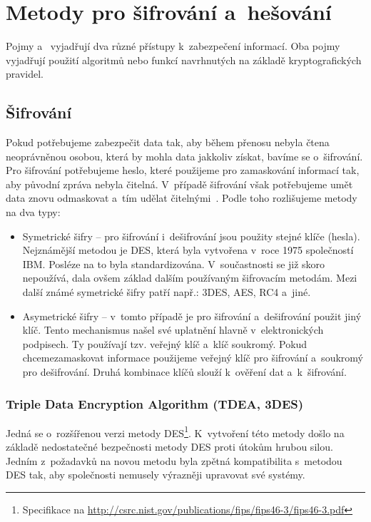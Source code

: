 \chapter{Metody pro šifrování a~hešování}
\label{ch:sifrovani}
Pojmy  a~ vyjadřují dva různé přístupy k~zabezpečení informací. Oba pojmy
vyjadřují použití algoritmů nebo funkcí navrhnutých na základě kryptografických pravidel. 
\section{Šifrování}
Pokud potřebujeme zabezpečit data tak, aby během přenosu nebyla čtena neoprávněnou osobou, která by
mohla data jakkoliv získat, bavíme se o~šifrování. Pro šifrování potřebujeme heslo, které použijeme
pro zamaskování informací tak, aby původní zpráva nebyla čitelná. V~případě šifrování však
potřebujeme umět data znovu odmaskovat a~tím udělat čitelnými~\cite{AC:1996}. Podle toho rozlišujeme metody na dva
typy:
\begin{itemize}
    \item Symetrické šifry -- pro šifrování i~dešifrování jsou použity stejné klíče (hesla).
        Nejznámější metodou je DES, která byla vytvořena v~roce 1975 společností IBM. Posléze na to
        byla standardizována. V~součastnosti se již skoro nepoužívá, dala ovšem základ dalším
        používaným šifrovacím metodám. Mezi další známé symetrické šifry patří např.: 3DES, AES, RC4
        a~jiné.
    \item Asymetrické šifry -- v~tomto případě je pro šifrování a~dešifrování použit jiný klíč.
        Tento mechanismus našel své uplatnění hlavně v~elektronických podpisech. Ty používají tzv.
        veřejný klíč a~klíč soukromý. Pokud chcemezamaskovat informace použijeme veřejný klíč pro
        šifrování a~soukromý pro dešifrování. Druhá kombinace klíčů slouží k~ověření dat a~k~šifrování.
\end{itemize}

\subsection{Triple Data Encryption Algorithm (TDEA, 3DES)}
Jedná se o~rozšířenou verzi metody
DES\footnote{Specifikace na \url{http://csrc.nist.gov/publications/fips/fips46-3/fips46-3.pdf}}.
K~vytvoření této metody došlo na základě nedostatečné bezpečnosti metody DES proti útokům hrubou
silou. Jedním z~požadavků na novou metodu byla zpětná kompatibilita s~metodou DES tak, aby
společnosti nemusely výrazněji upravovat své systémy.

